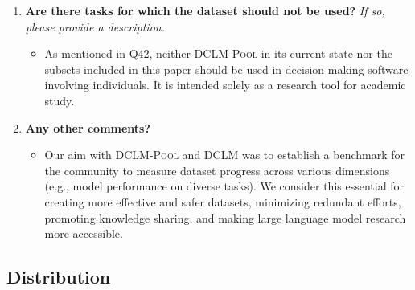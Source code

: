 \documentclass{article}
\newcommand{\dclm}{\textsc{DCLM}\xspace}
\newcommand{\rawpool}{\textsc{DCLM-Pool}\xspace}
\begin{document}
\begin{enumerate}[label=Q\arabic*, resume]
\begin{itemize}
\item \rawpool and its related datasets and models are not designed for use in production systems, particularly those involving sensitive areas such as race, gender identity or expression, ethnicity, sexual orientation, age, socioeconomic status, disability, religion, national origin, or creed. \rawpool is unsuitable for applications that involve decision-making about individuals. Since \rawpool is sourced from the internet, it inherently contains biases, unfairness, and stereotypes prevalent in society. It is intended solely as a research tool to examine language-modeling dataset curation on a large scale and to study the impact of various data curation methods on downstream models.
\end{itemize}

\item \textbf{Are there tasks for which the dataset should not be used?} \textit{If so, please provide a description.}


\begin{itemize}
\item As mentioned in Q42, neither \rawpool in its current state nor the subsets included in this paper should be used in decision-making software involving individuals. It is intended solely as a research tool for academic study.
\end{itemize}

\item \textbf{Any other comments?}

\begin{itemize}
\item Our aim with \rawpool and \dclm was to establish a benchmark for the community to measure dataset progress across various dimensions (e.g., model performance on diverse tasks). We consider this essential for creating more effective and safer datasets, minimizing redundant efforts, promoting knowledge sharing, and making large language model research more accessible.
\end{itemize}

\end{enumerate}

\subsection{Distribution}
\end{document}

